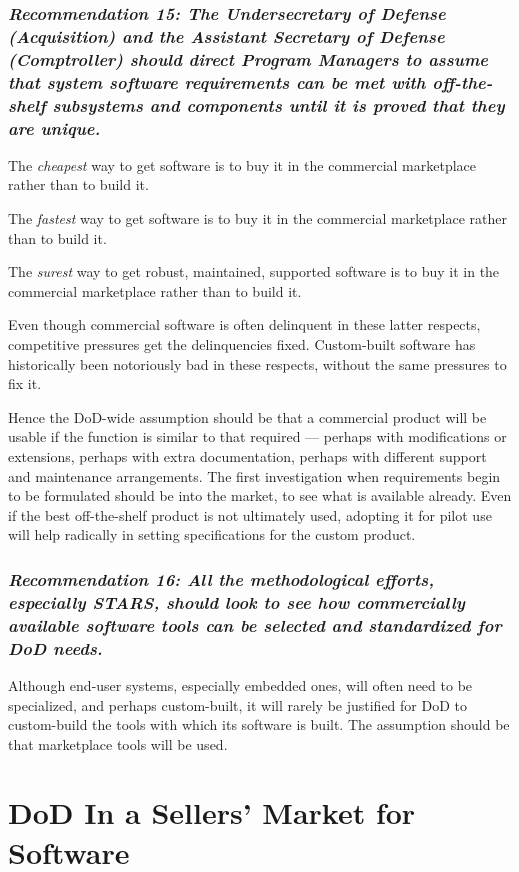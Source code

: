 \documentclass[12pt,final]{article}
\begin{document}
\subsubsection*{\textit{Recommendation 15: The Undersecretary of Defense
(Acquisition) and the Assistant Secretary of Defense (Comptroller) should
direct Program Managers to assume that system software requirements can be met
with off-the-shelf subsystems and components until it is proved that they are
unique.}}

The \emph{cheapest} way to get software is to buy it in the commercial
marketplace rather than to build it.

The \emph{fastest} way to get software is to buy it in the commercial
marketplace rather than to build it.

The \emph{surest} way to get robust, maintained, supported software is to buy
it in the commercial marketplace rather than to build it.

Even though commercial software is often delinquent in these latter respects,
competitive pressures get the delinquencies fixed. Custom-built software has
historically been notoriously bad in these respects, without the same pressures
to fix it.

Hence the DoD-wide assumption should be that a commercial product will be
usable if the function is similar to that required — perhaps with modifications
or extensions, perhaps with extra documentation, perhaps with different support
and maintenance arrangements.  The first investigation when requirements begin
to be formulated should be into the market, to see what is available already.
Even if the best off-the-shelf product is not ultimately used, adopting it for
pilot use will help radically in setting specifications for the custom product.

\subsubsection*{\textit{Recommendation 16: All the methodological efforts,
especially STARS, should look to see how commercially available software tools
can be selected and standardized for DoD needs.}}

Although end-user systems, especially embedded ones, will often need to be
specialized, and perhaps custom-built, it will rarely be justified for DoD to
custom-build the tools with which its software is built. The assumption should
be that marketplace tools will be used.

\section{DoD In a Sellers’ Market for Software}
\end{document}
